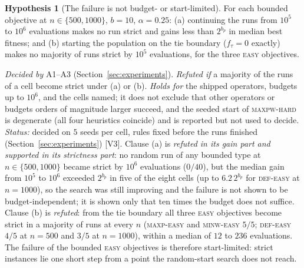 \documentclass[a4paper,11pt]{article}
\newcommand{\bp}{b_{p}}
\newcommand{\DEF}{\textsc{def}}
\newcommand{\MAXP}{\textsc{maxp}}
\newcommand{\MAXPW}{\textsc{maxpw}}
\newcommand{\MINW}{\textsc{minw}}
\newcommand{\evid}[1]{\textcolor{inkSoft}{\scriptsize[#1]}}
\theoremstyle{plain}
\theoremstyle{definition}
\newtheorem{hypothesis}{Hypothesis}
\theoremstyle{remark}
\begin{document}
\begin{hypothesis}[The failure is not budget- or start-limited]\label{h:budget}
For each bounded objective at $n\in\{500,1000\}$, $b=10$, $\alpha=0.25$:
(a) continuing the runs from $10^{5}$ to $10^{6}$ evaluations makes no run strict and gains
less than $2^{\bp}$ in median best fitness; and (b) starting the population on the tie
boundary ($f_\tau=0$ exactly) makes no majority of runs strict by $10^{5}$ evaluations, for
the three \textsc{easy} objectives.
\par\emph{Decided by} A1--A3 (Section~\ref{sec:experiments}). \emph{Refuted if} a majority of
the runs of a cell become strict under (a) or (b).
\emph{Holds for} the shipped operators, budgets up to $10^{6}$, and the cells named; it does
not exclude that other operators or budgets orders of magnitude larger succeed, and the
seeded start of \MAXPW-\textsc{hard} is degenerate (all four heuristics coincide) and is
reported but not used to decide.
\emph{Status:} decided on $5$ seeds per cell, rules fixed before the runs finished
(Section~\ref{sec:experiments}) \evid{V3}.
Clause (a) is \emph{refuted in its gain part and supported in its strictness part}: no random
run of any bounded type at $n\in\{500,1000\}$ became strict by $10^{6}$ evaluations ($0/40$),
but the median gain from $10^{5}$ to $10^{6}$ exceeded $2^{\bp}$ in five of the eight cells
(up to $6.2\,2^{\bp}$ for \DEF-\textsc{easy} at $n=1000$), so the search was still improving
and the failure is not shown to be budget-independent; it is shown only that ten times the
budget does not suffice.
Clause (b) is \emph{refuted}: from the tie boundary all three \textsc{easy} objectives
become strict in a majority of runs at every $n$ (\MAXP-\textsc{easy} and
\MINW-\textsc{easy} $5/5$; \DEF-\textsc{easy} $4/5$ at $n=500$ and $3/5$ at $n=1000$),
within a median of $12$ to $236$ evaluations. The failure of the bounded \textsc{easy}
objectives is therefore start-limited: strict instances lie one short step from a point
the random-start search does not reach.
\end{hypothesis}
\end{document}
